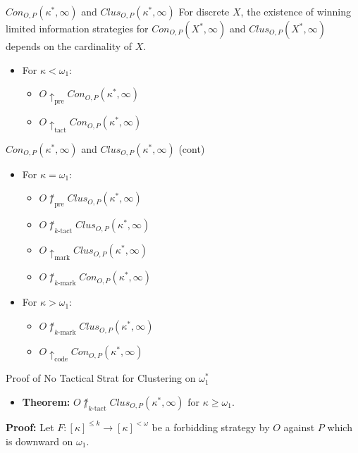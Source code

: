 \documentclass{beamer}
\newcommand{\prewin}{\uparrow_{\text{pre}}}
\newcommand{\markwin}{\uparrow_{\text{mark}}}
\newcommand{\tactwin}{\uparrow_{\text{tact}}}
\newcommand{\ktactwin}[1]{\uparrow_{#1\text{-tact}}}
\newcommand{\kmarkwin}[1]{\uparrow_{#1\text{-mark}}}
\newcommand{\codewin}{\uparrow_{\text{code}}}
\newcommand{\oneptcomp}[1]{#1^*}
\newcommand{\congame}[2]{Con_{O,P}(#1,#2)}
\newcommand{\clusgame}[2]{Clus_{O,P}(#1,#2)}
\begin{document}
\begin{frame}{$\congame{\oneptcomp{\kappa}}{\infty}$ and $\clusgame{\oneptcomp{\kappa}}{\infty}$}
For discrete $X$, the existence of winning limited information strategies for $\congame{\oneptcomp{X}}{\infty}$ and $\clusgame{\oneptcomp{X}}{\infty}$ depends on the cardinality of $X$.
\pause
\begin{itemize}
\item For $\kappa<\omega_1$:
    \begin{itemize}
    \item $O\prewin\congame{\oneptcomp{\kappa}}{\infty}$
    \item $O\tactwin\congame{\oneptcomp{\kappa}}{\infty}$
    \end{itemize}
\end{itemize}
\end{frame}

\begin{frame}{$\congame{\oneptcomp{\kappa}}{\infty}$ and $\clusgame{\oneptcomp{\kappa}}{\infty}$ (cont)}
\begin{itemize}
\item For $\kappa=\omega_1$:
    \begin{itemize}
    \item $O\not\prewin\clusgame{\oneptcomp{\kappa}}{\infty}$
    \item $O\not\ktactwin{k}\clusgame{\oneptcomp{\kappa}}{\infty}$
    \item $O\markwin\clusgame{\oneptcomp{\kappa}}{\infty}$
    \item $O\not\kmarkwin{k}\congame{\oneptcomp{\kappa}}{\infty}$
    \end{itemize}
\pause
\item For $\kappa>\omega_1$:
    \begin{itemize}
    \item $O\not\kmarkwin{k}\clusgame{\oneptcomp{\kappa}}{\infty}$
    \item $O\codewin\congame{\oneptcomp{\kappa}}{\infty}$
    \end{itemize}
\end{itemize}
\end{frame}

\begin{frame}{Proof of No Tactical Strat for Clustering on $\oneptcomp{\omega_1}$}
\begin{itemize}
\item \textbf{Theorem:} $O\not\ktactwin{k}\clusgame{\oneptcomp{\kappa}}{\infty}$ for $\kappa\geq\omega_1$.
\end{itemize}
\pause
\textbf{Proof:} Let $F:[\kappa]^{\leq k} \to [\kappa]^{<\omega}$ be a forbidding strategy by $O$ against $P$ which is downward on $\omega_1$.
\end{frame}
\end{document}
